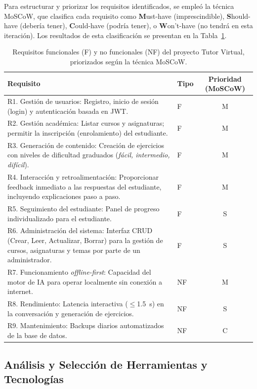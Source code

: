 Para estructurar y priorizar los requisitos identificados, se empleó la técnica MoSCoW, que clasifica cada requisito como \textbf{M}ust-have (imprescindible), \textbf{S}hould-have (debería tener), \textbf{C}ould-have (podría tener), o \textbf{W}on't-have (no tendrá en esta iteración). Los resultados de esta clasificación se presentan en la Tabla~\ref{tab:desarrollo_reqs}.

\begin{table}[H]
\centering
\begin{tabular}{@{}p{7.5cm}lc@{}}
\toprule
\textbf{Requisito} & \textbf{Tipo} & \textbf{Prioridad (MoSCoW)}\\
\midrule
R1. Gestión de usuarios: Registro, inicio de sesión (login) y autenticación basada en JWT. & F & M \\
R2. Gestión académica: Listar cursos y asignaturas; permitir la inscripción (enrolamiento) del estudiante. & F & M \\
R3. Generación de contenido: Creación de ejercicios con niveles de dificultad graduados (\emph{fácil, intermedio, difícil}). & F & M \\
R4. Interacción y retroalimentación: Proporcionar feedback inmediato a las respuestas del estudiante, incluyendo explicaciones paso a paso. & F & M \\
R5. Seguimiento del estudiante: Panel de progreso individualizado para el estudiante. & F & S \\
R6. Administración del sistema: Interfaz CRUD (Crear, Leer, Actualizar, Borrar) para la gestión de cursos, asignaturas y temas por parte de un administrador. & F & S \\
R7. Funcionamiento \emph{offline-first}: Capacidad del motor de IA para operar localmente sin conexión a internet. & NF & M \\
R8. Rendimiento: Latencia interactiva (\(\le\)\SI{1.5}{s}) en la conversación y generación de ejercicios. & NF & S \\
R9. Mantenimiento: Backups diarios automatizados de la base de datos. & NF & C \\
\bottomrule
\end{tabular}
\caption{Requisitos funcionales (F) y no funcionales (NF) del proyecto Tutor Virtual, priorizados según la técnica MoSCoW.}
\label{tab:desarrollo_reqs}
\end{table}

\subsection{Análisis y Selección de Herramientas y Tecnologías}
\label{ssec:desarrollo_tooling}

